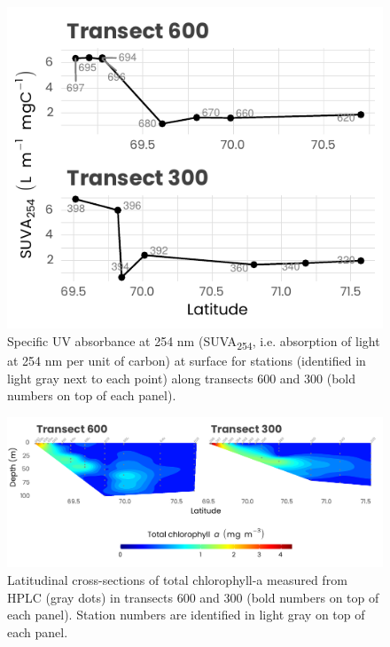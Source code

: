 \documentclass[essd, manuscript]{copernicus}
\begin{document}
\clearpage

\begin{figure}[H]
	\centering
	\includegraphics[scale = 1]{../../../graphs/fig06.pdf}
	\caption{Specific UV absorbance at 254 nm (SUVA\textsubscript{254}, i.e. absorption of light at 254 nm per unit of carbon) at surface for stations (identified in light gray next to each point) along transects 600 and 300 (bold numbers on top of each panel).}
\end{figure}

\clearpage

\begin{figure}[H]
	\centering
	\includegraphics[scale = 1]{../../../graphs/fig07.pdf}
	\caption{Latitudinal cross-sections of total chlorophyll-a measured from HPLC (gray dots) in transects 600 and 300 (bold numbers on top of each panel). Station numbers are identified in light gray on top of each panel.}
\end{figure}
\end{document}
